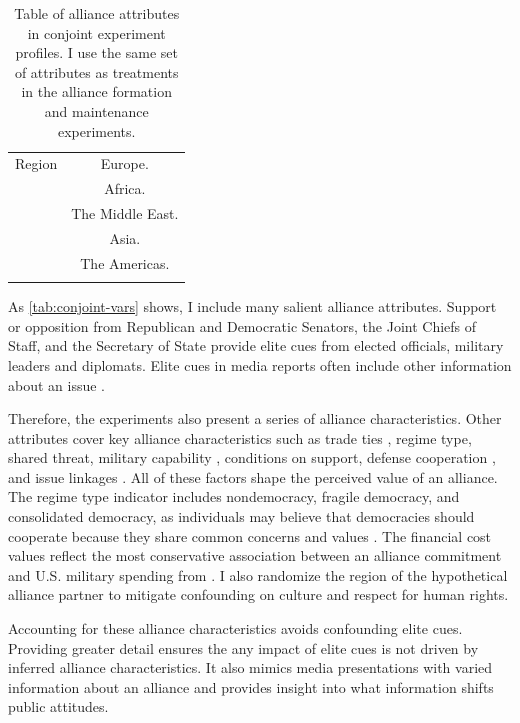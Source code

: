 \documentclass[12pt]{article}
\begin{document}
\begin{table}
\begin{adjustbox}{width = .99\textwidth}
\begin{tabular}{lc}
Region              & Europe. \\ 
                    & Africa. \\
                    & The Middle East. \\ 
                    & Asia. \\   
                    & The Americas. \\ 
                                                                            
\hline \\
\end{tabular}
\end{adjustbox}
\caption{Table of alliance attributes in conjoint experiment profiles. I use the same set of attributes as treatments in the alliance formation and maintenance experiments.} 
\label{tab:conjoint-vars}
\end{table}


As \autoref{tab:conjoint-vars} shows, I include many salient alliance attributes.
Support or opposition from Republican and Democratic Senators, the Joint Chiefs of Staff, and the Secretary of State provide elite cues from elected officials, military leaders and diplomats. 
Elite cues in media reports often include other information about an issue \citep{BaumPotter2008}. 


Therefore, the experiments also present a series of alliance characteristics. 
Other attributes cover key alliance characteristics such as trade ties \citep{Fordham2010}, regime type, shared threat, military capability \citep{Johnsonetal2015}, conditions on support, defense cooperation \citep{Morrow1994, LeedsAnac2005}, and issue linkages \citep{Poast2012}.
All of these factors shape the perceived value of an alliance. 
The regime type indicator includes nondemocracy, fragile democracy, and consolidated democracy, as individuals may believe that democracies should cooperate because they share common concerns and values \citep{Chuetal2021}. 
The financial cost values reflect the most conservative association between an alliance commitment and U.S. military spending from \citet{AlleyFuhrmann2021}. 
I also randomize the region of the hypothetical alliance partner to mitigate confounding on culture and respect for human rights.  


Accounting for these alliance characteristics avoids confounding elite cues. 
Providing greater detail ensures the any impact of elite cues is not driven by inferred alliance characteristics.
It also mimics media presentations with varied information about an alliance and provides insight into what information shifts public attitudes. 
\end{document}
